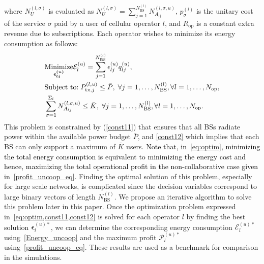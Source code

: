 \documentclass[10pt, letter, twocolumn]{IEEEtran}
\begin{document}
where $N_U^{(l,\sigma)}$ is evaluated as $N_U^{(l,\sigma)}=\sum_{j=1}^{N_{\text{BS}}^{(l)}}N_{A_{lj}}^{(l,\sigma,u)}$, $p^{(l)}_\sigma$ is the unitary cost of the service $\sigma$ paid by a user of cellular operator $l$, and $R_{\mathrm{op}}$ is a constant extra revenue due to subscriptions. Each operator wishes to minimize its energy consumption as follows:
\normalsize
\begin{align}
\small
&\underset{\boldsymbol{\boldsymbol{\epsilon}_{lj}^{(u)}}}{\text{Minimize}}
{\mathcal E}_l^{(u)}=\sum_{j=1}^{N_{\mathrm{BS}}^{(l)}}\epsilon^{(u)}_{lj} q_{lj}^{(u)}, \label{eq:optim}\\
&\text{Subject to:}\;
P_{\text{tx},j}^{(l,u)} \leq \bar{P}, \; \forall j = 1,\ldots, N_{\text{BS}}^{(l)}  , \forall l = 1,\ldots, N_{\text{op}}, \label{const11}\\
&\sum_{\sigma=1}^{\Sigma_l}N_{A_{lj}}^{(l,\sigma,u)} \leq \bar{K} , \; \forall j = 1,\ldots, N_{\text{BS}}^{(l)} , \forall l = 1,\ldots, N_{\text{op}}.  \label{const12}
\end{align}
\normalsize
This problem is constrained by (\ref{const11}) that ensures that all BSs radiate power within the available power budget $\bar{P}$, and \eqref{const12} which implies that each BS can only support a maximum of $\bar{K}$ users. \textcolor{black}{Note that, in~\eqref{eq:optim}, minimizing the total energy consumption is equivalent to minimizing the energy cost and hence, maximizing the total operational profit in the non-collaborative case given in~\eqref{profit_uncoop_eq}}. Finding the optimal solution of this problem, especially for large scale networks, is complicated since the decision variables correspond to large binary vectors of length $N_{\mathrm{BS}}^{(l)}$. We propose an iterative algorithm to solve this problem later in this paper. Once the optimization problem expressed in~\cref{eq:optim,const11,const12} is solved for each operator $l$ by finding the best solution $\boldsymbol{\epsilon}_l^{(u)*}$, we can determine the corresponding energy consumption $\mathcal{E}_{l}^{(u)*}$ using~\eqref{Energy_uncoop} and the maximum profit ${\mathcal P}_l^{(u)*}$ using~\eqref{profit_uncoop_eq}. These results are used as a benchmark for comparison in the simulations.
\end{document}
